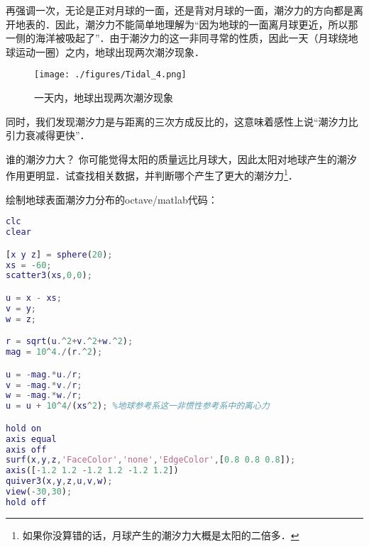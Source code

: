 再强调一次，无论是正对月球的一面，还是背对月球的一面，潮汐力的方向都是离开地表的．因此，潮汐力不能简单地理解为“因为地球的一面离月球更近，所以那一侧的海洋被吸起了”．由于潮汐力的这一非同寻常的性质，因此一天（月球绕地球运动一圈）之内，地球出现两次潮汐现象．
\begin{figure}[ht]
\centering
\texttt{[image: ./figures/Tidal\_4.png]}
\caption{一天内，地球出现两次潮汐现象} \label{Tidal_fig4}
\end{figure}

同时，我们发现潮汐力是与距离的三次方成反比的，这意味着感性上说“潮汐力比引力衰减得更快”．
\begin{exercise}{谁的潮汐力大？}
你可能觉得太阳的质量远比月球大，因此太阳对地球产生的潮汐作用更明显．试查找相关数据，并判断哪个产生了更大的潮汐力\footnote{如果你没算错的话，月球产生的潮汐力大概是太阳的二倍多．}．
\end{exercise}




绘制地球表面潮汐力分布的octave/matlab代码：
\begin{lstlisting}[language=matlab]
clc
clear

[x y z] = sphere(20);
xs = -60;
scatter3(xs,0,0);

u = x - xs;
v = y;
w = z;

r = sqrt(u.^2+v.^2+w.^2);
mag = 10^4./(r.^2);

u = -mag.*u./r;
v = -mag.*v./r;
w = -mag.*w./r;
u = u + 10^4/(xs^2); %地球参考系这一非惯性参考系中的离心力

hold on
axis equal
axis off
surf(x,y,z,'FaceColor','none','EdgeColor',[0.8 0.8 0.8]);
axis([-1.2 1.2 -1.2 1.2 -1.2 1.2])
quiver3(x,y,z,u,v,w);
view(-30,30);
hold off

\end{lstlisting}